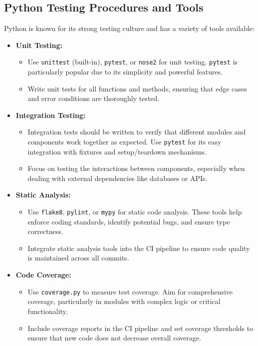 \documentclass{ol-softwaremanual}
\begin{document}
\subsection{Python Testing Procedures and Tools}

Python is known for its strong testing culture and has a variety of tools available:

\begin{itemize}
    \item \textbf{Unit Testing:}
    \begin{itemize}
        \item Use \texttt{unittest} (built-in), \texttt{pytest}, or \texttt{nose2} for unit testing. \texttt{pytest} is particularly popular due to its simplicity and powerful features.
        \item Write unit tests for all functions and methods, ensuring that edge cases and error conditions are thoroughly tested.
    \end{itemize}
    
    \item \textbf{Integration Testing:}
    \begin{itemize}
        \item Integration tests should be written to verify that different modules and components work together as expected. Use \texttt{pytest} for its easy integration with fixtures and setup/teardown mechanisms.
        \item Focus on testing the interactions between components, especially when dealing with external dependencies like databases or APIs.
    \end{itemize}
    
    \item \textbf{Static Analysis:}
    \begin{itemize}
        \item Use \texttt{flake8}, \texttt{pylint}, or \texttt{mypy} for static code analysis. These tools help enforce coding standards, identify potential bugs, and ensure type correctness.
        \item Integrate static analysis tools into the CI pipeline to ensure code quality is maintained across all commits.
    \end{itemize}
    
    \item \textbf{Code Coverage:}
    \begin{itemize}
        \item Use \texttt{coverage.py} to measure test coverage. Aim for comprehensive coverage, particularly in modules with complex logic or critical functionality.
        \item Include coverage reports in the CI pipeline and set coverage thresholds to ensure that new code does not decrease overall coverage.
    \end{itemize}
    

\end{itemize}
\end{document}
